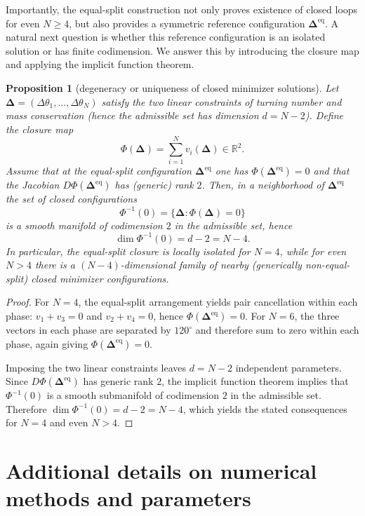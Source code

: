 \documentclass[
aip,
jcp,
reprint, 
floatfix
]{revtex4-1}
\newtheorem{proposition}[theorem]{Proposition}
\begin{document}
Importantly, the equal-split construction not only proves existence of closed loops for even $N \geq 4$, but also provides a symmetric reference configuration $\mathbf{\Delta}^{\mathrm{eq}}$. A natural next question is whether this reference configuration is an isolated solution or has finite codimension.  We answer this by introducing the closure map and applying the implicit function theorem.
\begin{proposition}[degeneracy or uniqueness of closed minimizer solutions]\label{prop:local_manifold_closure}
Let $\boldsymbol{\Delta}=(\Delta\theta_1,\dots,\Delta\theta_N)$ satisfy the two linear constraints of turning number and mass conservation (hence the admissible set has dimension $d=N-2$).  
Define the closure map
\[
\Phi(\boldsymbol{\Delta})=\sum_{i=1}^N v_i(\boldsymbol{\Delta})\in\mathbb{R}^2.
\]
Assume that at the equal-split configuration $\boldsymbol{\Delta}^{\mathrm{eq}}$ one has $\Phi(\boldsymbol{\Delta}^{\mathrm{eq}})=0$ and that the Jacobian
$D\Phi(\boldsymbol{\Delta}^{\mathrm{eq}})$ has (generic) rank $2$. Then, in a neighborhood of
$\boldsymbol{\Delta}^{\mathrm{eq}}$ the set of closed configurations
\[
\Phi^{-1}(0)=\{\boldsymbol{\Delta}:\Phi(\boldsymbol{\Delta})=0\}
\]
is a smooth manifold of codimension $2$ in the admissible set, hence
\[
\dim \Phi^{-1}(0)=d-2=N-4.
\]
In particular, the equal-split closure is locally isolated for $N=4$, while for even $N>4$ there is a $(N-4)$-dimensional family of nearby (generically non-equal-split) closed minimizer configurations.
\end{proposition}

\begin{proof}
For $N=4$, the equal-split arrangement yields pair cancellation within each phase:
$v_1+v_3=0$ and $v_2+v_4=0$, hence $\Phi(\boldsymbol{\Delta}^{\mathrm{eq}})=0$.
For $N=6$, the three vectors in each phase are separated by $120^\circ$ and therefore sum to zero within each phase, again giving $\Phi(\boldsymbol{\Delta}^{\mathrm{eq}})=0$.

Imposing the two linear constraints leaves $d=N-2$ independent parameters. Since
$D\Phi(\boldsymbol{\Delta}^{\mathrm{eq}})$ has generic rank $2$, the implicit function theorem implies that
$\Phi^{-1}(0)$ is a smooth submanifold of codimension $2$ in the admissible set. Therefore
$\dim \Phi^{-1}(0)=d-2=N-4$, which yields the stated consequences for $N=4$ and even $N>4$.
\end{proof}

\section{Additional details on numerical methods and parameters} \label{secapp: numerical}
\end{document}
